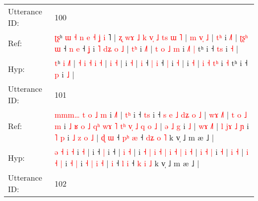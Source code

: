 \documentclass[10pt]{article}
\DeclareRobustCommand{\hl}[1]{{\textcolor{red}{#1}}}
\begin{document}
\begin{longtable}{ll}
 \\
\midrule
Utterance ID: & 100 \\
Ref: & \hl{ʈ}\hl{ʂ}ʰ\hl{ }\hl{ɯ}\hl{ }\hl{˧}\hl{ }\hl{n}\hl{ }\hl{e}\hl{ }\hl{˧} \hl{ʝ} \hl{i}\hl{ }˥ |\hl{ }\hl{ʐ}\hl{ }\hl{w}\hl{ɤ}\hl{ }\hl{˩}\hl{ }\hl{k} \hl{v}\hl{̩} \hl{˩} \hl{t}\hl{s} \hl{ɯ} \hl{˥} |\hl{ }\hl{m} \hl{v}\hl{̩} \hl{˩} |\hl{ }\hl{t}\hl{ʰ} i \hl{˩}\hl{˥} |\hl{ }\hl{ʈ}\hl{ʂ}\hl{ʰ} \hl{ɯ} ˧ \hl{n} \hl{e} ˧ \hl{ʝ} i\hl{ }\hl{˥}\hl{ }\hl{d}\hl{ʑ}\hl{ }\hl{o} \hl{˩} |\hl{ }\hl{t}\hl{ʰ} i \hl{˩}\hl{˥} | \hl{t} \hl{o} \hl{˩}\hl{ }\hl{m} i\hl{ }\hl{˩}\hl{˥} \hl{|} tʰ i ˧ \hl{t}\hl{s} i \hl{˧} |
 \\
Hyp: & \hl{}\hl{t}ʰ\hl{}\hl{}\hl{}\hl{}\hl{}\hl{}\hl{}\hl{}\hl{}\hl{} \hl{i} \hl{}\hl{˩}˥ |\hl{}\hl{}\hl{}\hl{}\hl{}\hl{}\hl{}\hl{}\hl{} \hl{}\hl{˧} \hl{i} \hl{}\hl{˧} \hl{i} \hl{˧} |\hl{}\hl{} \hl{}\hl{i} \hl{˧} |\hl{}\hl{}\hl{} i \hl{}\hl{˧} |\hl{}\hl{}\hl{}\hl{} \hl{i} ˧ \hl{|} \hl{i} ˧ \hl{|} i\hl{}\hl{}\hl{}\hl{}\hl{}\hl{}\hl{} \hl{˧} |\hl{}\hl{}\hl{} i \hl{}\hl{˧} | \hl{i} \hl{˧} \hl{}\hl{t}\hl{ʰ} i\hl{}\hl{}\hl{} \hl{˧} tʰ i ˧ \hl{}\hl{p} i \hl{˩} |
 \\
\midrule
Utterance ID: & 101 \\
Ref: & \hl{m}\hl{m}\hl{m}\hl{…}\hl{ }\hl{t} \hl{o} \hl{˩} \hl{m} i \hl{˩}\hl{˥} |\hl{ }\hl{t}\hl{ʰ} i ˧ \hl{t}\hl{s} i ˧\hl{ }\hl{s}\hl{ }\hl{e}\hl{ }\hl{˩}\hl{ }\hl{d}\hl{ʑ}\hl{ }\hl{o}\hl{ }\hl{˩} | \hl{w}\hl{ɤ} \hl{˩}\hl{˥} |\hl{ }\hl{t}\hl{ }\hl{o}\hl{ }\hl{˩}\hl{ }\hl{m} i\hl{ }\hl{˩}\hl{ }\hl{ʁ}\hl{ }\hl{o} \hl{˩} \hl{q}\hl{ʰ} \hl{w}\hl{ɤ} \hl{˥} \hl{t}\hl{ʰ} \hl{v}\hl{̩} \hl{˩} \hl{q} \hl{o} \hl{˩} | \hl{ə} \hl{˩} \hl{g} i \hl{˩} | \hl{w}\hl{ɤ} \hl{˩}\hl{˥} |\hl{ }\hl{l} \hl{j}\hl{ɤ} \hl{˩} \hl{ɲ} i \hl{˥} \hl{p} i \hl{˩} \hl{z} \hl{o} \hl{˩} |\hl{ }\hl{ɖ} \hl{ɯ} ˧ \hl{p}\hl{ʰ} \hl{æ} ˧ \hl{d}\hl{ʑ} \hl{o} \hl{˥} k v̩ ˩ m æ ˩ |
 \\
Hyp: & \hl{}\hl{}\hl{}\hl{}\hl{}\hl{ə} \hl{˧} \hl{i} \hl{˧} i \hl{}\hl{˧} |\hl{}\hl{}\hl{} i ˧ \hl{}\hl{|} i ˧\hl{}\hl{}\hl{}\hl{}\hl{}\hl{}\hl{}\hl{}\hl{}\hl{}\hl{}\hl{}\hl{} | \hl{}\hl{i} \hl{}\hl{˧} |\hl{}\hl{}\hl{}\hl{}\hl{}\hl{}\hl{}\hl{} i\hl{}\hl{}\hl{}\hl{}\hl{}\hl{} \hl{˧} \hl{}\hl{|} \hl{}\hl{i} \hl{˧} \hl{}\hl{|} \hl{}\hl{i} \hl{˧} \hl{|} \hl{i} \hl{˧} | \hl{i} \hl{˧} \hl{|} i \hl{˧} | \hl{}\hl{i} \hl{}\hl{˧} |\hl{}\hl{} \hl{}\hl{i} \hl{˧} \hl{|} i \hl{˧} \hl{|} i \hl{˧} \hl{|} \hl{i} \hl{˧} |\hl{}\hl{} \hl{i} ˧ \hl{}\hl{l} \hl{i} ˧ \hl{}\hl{k} \hl{i} \hl{˩} k v̩ ˩ m æ ˩ |
 \\
\midrule
Utterance ID: & 102 \\

\end{longtable}
\end{document}
